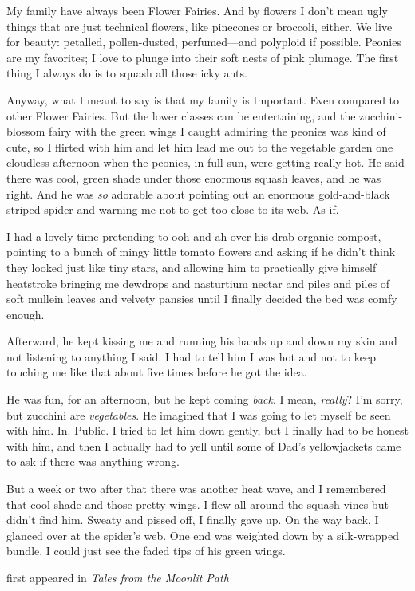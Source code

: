 My family have always been Flower Fairies. And by flowers I don't mean
ugly things that are just technical flowers, like pinecones or broccoli,
either. We live for beauty: petalled, pollen-dusted, perfumed---and
polyploid if possible. Peonies are my favorites; I love to plunge into
their soft nests of pink plumage. The first thing I always do is to
squash all those icky ants.

Anyway, what I meant to say is that my family is Important. Even
compared to other Flower Fairies. But the lower classes can be
entertaining, and the zucchini-blossom fairy with the green wings I
caught admiring the peonies was kind of cute, so I flirted with him and
let him lead me out to the vegetable garden one cloudless afternoon when
the peonies, in full sun, were getting really hot. He said there was
cool, green shade under those enormous squash leaves, and he was right.
And he was \emph{so} adorable about pointing out an enormous
gold-and-black striped spider and warning me not to get too close to its
web. As if.

I had a lovely time pretending to ooh and ah over his drab organic
compost, pointing to a bunch of mingy little tomato flowers and asking
if he didn't think they looked just like tiny stars, and allowing him to
practically give himself heatstroke bringing me dewdrops and nasturtium
nectar and piles and piles of soft mullein leaves and velvety pansies
until I finally decided the bed was comfy enough.

Afterward, he kept kissing me and running his hands up and down my skin
and not listening to anything I said. I had to tell him I was hot and
not to keep touching me like that about five times before he got the
idea.

He was fun, for an afternoon, but he kept coming \emph{back}. I mean,
\emph{really}? I'm sorry, but zucchini are \emph{vegetables}. He
imagined that I was going to let myself be seen with him. In. Public. I
tried to let him down gently, but I finally had to be honest with him,
and then I actually had to yell until some of Dad's yellowjackets came
to ask if there was anything wrong.

But a week or two after that there was another heat wave, and I
remembered that cool shade and those pretty wings. I flew all around the
squash vines but didn't find him. Sweaty and pissed off, I finally gave
up. On the way back, I glanced over at the spider's web. One end was
weighted down by a silk-wrapped bundle. I could just see the faded tips
of his green wings.

first appeared in \emph{Tales from the Moonlit Path}
